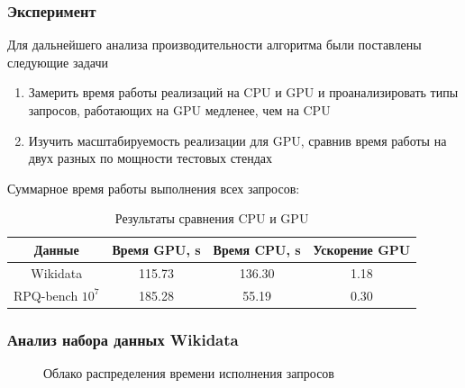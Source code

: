 \documentclass[aspectratio=169]{beamer}
\begin{document}
\begin{frame}[t]
  \frametitle{Эксперимент}
Для дальнейшего анализа производительности алгоритма были поставлены следующие задачи
\begin{enumerate}
    \item Замерить время работы реализаций на CPU и GPU и проанализировать типы запросов, работающих на GPU медленее, чем на CPU
    \item Изучить масштабируемость реализации для GPU, сравнив время работы на двух разных по мощности тестовых стендах
\end{enumerate}  

Суммарное время работы выполнения всех запросов:
\begin{table}
    \centering
    \begin{tabular}{|c|c|c|c|}
\hline
Данные & Время GPU, \si{\second} & Время CPU, \si{\second} & Ускорение GPU \\
\hline
Wikidata & 115.73 & 136.30 & 1.18 \\
\hline
RPQ-bench $10^7$ & 185.28 & 55.19 & 0.30 \\
\hline
    \end{tabular}
    \caption{Результаты сравнения CPU и GPU}
    \label{tab:ExpResults}
\end{table}
\end{frame}

\begin{frame}[t]
  \frametitle{Анализ набора данных Wikidata}
  
\begin{figure}[H]
    \centering
     
    \caption{Облако распределения времени исполнения запросов}
    \label{GraphicFull}  
\end{figure}
    
\end{frame}
\end{document}
